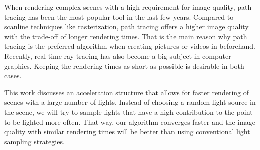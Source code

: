 
\Abstract

When rendering complex scenes with a high requirement for image quality, path tracing has been the most popular tool in the last few years. Compared to scanline techniques like rasterization, path tracing offers a higher image quality with the trade-off of longer rendering times. That is the main reason why path tracing is the preferred algorithm when creating pictures or videos in beforehand. Recently, real-time ray tracing has also become a big subject in computer graphics. Keeping the rendering times as short as possible is desirable in both cases.

This work discusses an acceleration structure that allows for faster rendering of scenes with a large number of lights. Instead of choosing a random light source in the scene, we will try to sample lights that have a high contribution to the point to be lighted more often. That way, our algorithm converges faster and the image quality with similar rendering times will be better than using conventional light sampling strategies.
